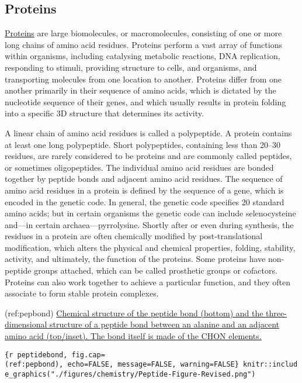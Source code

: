 \hypertarget{proteins}{%
\subsection{Proteins}\label{proteins}}

\href{https://en.wikipedia.org/wiki/Protein}{Proteins} are large
biomolecules, or macromolecules, consisting of one or more long chains
of amino acid residues. Proteins perform a vast array of functions
within organisms, including catalysing metabolic reactions, DNA
replication, responding to stimuli, providing structure to cells, and
organisms, and transporting molecules from one location to another.
Proteins differ from one another primarily in their sequence of amino
acids, which is dictated by the nucleotide sequence of their genes, and
which usually results in protein folding into a specific 3D structure
that determines its activity.

A linear chain of amino acid residues is called a polypeptide. A protein
contains at least one long polypeptide. Short polypeptides, containing
less than 20--30 residues, are rarely considered to be proteins and are
commonly called peptides, or sometimes oligopeptides. The individual
amino acid residues are bonded together by peptide bonds and adjacent
amino acid residues. The sequence of amino acid residues in a protein is
defined by the sequence of a gene, which is encoded in the genetic code.
In general, the genetic code specifies 20 standard amino acids; but in
certain organisms the genetic code can include selenocysteine and---in
certain archaea---pyrrolysine. Shortly after or even during synthesis,
the residues in a protein are often chemically modified by
post-translational modification, which alters the physical and chemical
properties, folding, stability, activity, and ultimately, the function
of the proteins. Some proteins have non-peptide groups attached, which
can be called prosthetic groups or cofactors. Proteins can also work
together to achieve a particular function, and they often associate to
form stable protein complexes.

(ref:pepbond)
\href{https://commons.wikimedia.org/wiki/File:Peptide-Figure-Revised.png}{Chemical
structure of the peptide bond (bottom) and the three-dimensional
structure of a peptide bond between an alanine and an adjacent amino
acid (top/inset). The bond itself is made of the CHON elements.}

\texttt{\{r\ peptidebond,\ fig.cap=\textquotesingle{}(ref:pepbond)\textquotesingle{},\ echo=FALSE,\ message=FALSE,\ warning=FALSE\}\ knitr::include\_graphics("./figures/chemistry/Peptide-Figure-Revised.png")}

